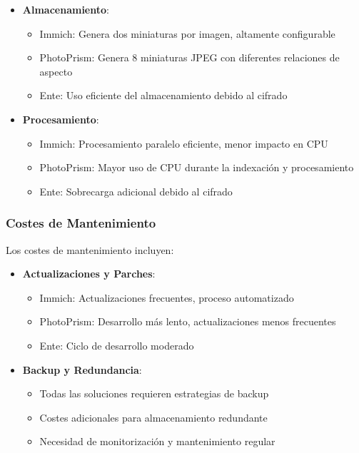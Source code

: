 \begin{itemize}
    \item \textbf{Almacenamiento}:
    \begin{itemize}
        \item Immich: Genera dos miniaturas por imagen, altamente configurable
        \item PhotoPrism: Genera 8 miniaturas JPEG con diferentes relaciones de aspecto
        \item Ente: Uso eficiente del almacenamiento debido al cifrado
    \end{itemize}
    
    \item \textbf{Procesamiento}:
    \begin{itemize}
        \item Immich: Procesamiento paralelo eficiente, menor impacto en CPU
        \item PhotoPrism: Mayor uso de CPU durante la indexación y procesamiento
        \item Ente: Sobrecarga adicional debido al cifrado
    \end{itemize}
\end{itemize}

\subsubsection{Costes de Mantenimiento}

Los costes de mantenimiento incluyen:

\begin{itemize}
    \item \textbf{Actualizaciones y Parches}:
    \begin{itemize}
        \item Immich: Actualizaciones frecuentes, proceso automatizado
        \item PhotoPrism: Desarrollo más lento, actualizaciones menos frecuentes
        \item Ente: Ciclo de desarrollo moderado
    \end{itemize}
    
    \item \textbf{Backup y Redundancia}:
    \begin{itemize}
        \item Todas las soluciones requieren estrategias de backup
        \item Costes adicionales para almacenamiento redundante
        \item Necesidad de monitorización y mantenimiento regular
    \end{itemize}
\end{itemize}

